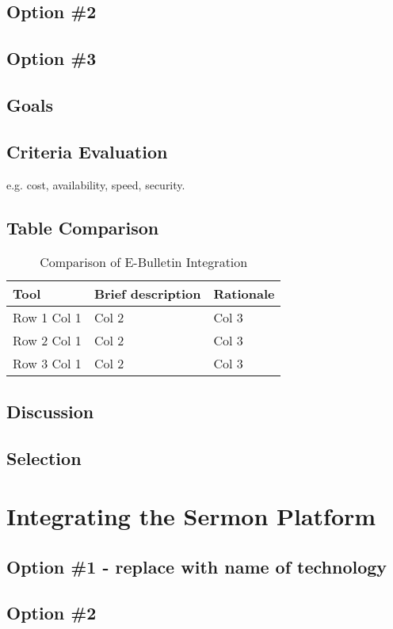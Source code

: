 \documentclass[letterpaper,10pt,draftclsnofoot,onecolumn,titlepage]{IEEEtran}
\begin{document}
	\subsection{Option \#2}
	\subsection{Option \#3}
	\subsection{Goals}
	\subsection{Criteria Evaluation}
	e.g. cost, availability, speed, security.
	\subsection{Table Comparison}
	\begin{table}[ht]
	\caption{Comparison of E-Bulletin Integration}
	\begin{center}
	\begin{tabular} { | m{3cm} | m{5cm} | m{5cm} | }
	\hline\hline
	Tool & Brief description & Rationale \\ [0.5ex]
	\hline
	Row 1 Col 1 & Col 2 & Col 3 \\
	\hline
	Row 2 Col 1 & Col 2 & Col 3 \\
	\hline
	Row 3 Col 1 & Col 2 & Col 3 \\
	\hline
	\end{tabular}
	\end{center}
	\end{table}
	\subsection{Discussion}
	\subsection{Selection}

	\section{Integrating the Sermon Platform}
	\subsection{Option \#1 - replace with name of technology}
	\subsection{Option \#2}
\end{document}
